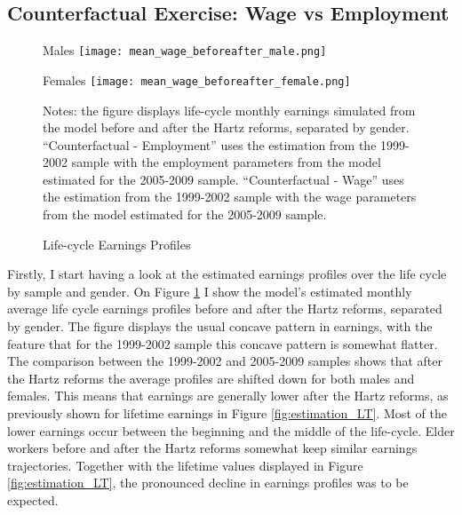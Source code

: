 \documentclass[12pt, a4paper]{article}
\let\Oldsubsection\subsection
\renewcommand{\subsection}{\FloatBarrier\Oldsubsection}
\begin{document}
\subsection{Counterfactual Exercise: Wage vs Employment}

\begin{figure}[!t]
	\centering
	\begin{minipage}[b]{0.48\textwidth}{Males}
		\centering
		\texttt{[image: mean\_wage\_beforeafter\_male.png]}
	\end{minipage}
	\begin{minipage}[b]{0.48\textwidth}{Females}
		\centering
		\texttt{[image: mean\_wage\_beforeafter\_female.png]}
	\end{minipage}
	\footnotesize{
		\justifying Notes: the figure displays life-cycle monthly earnings simulated from the model before and after the Hartz reforms, separated by gender. ``Counterfactual - Employment'' uses the estimation from the 1999-2002 sample with the employment parameters from the model estimated for the 2005-2009 sample. ``Counterfactual - Wage'' uses the estimation from the 1999-2002 sample with the wage parameters from the model estimated for the 2005-2009 sample.\par}
	\captionsetup{font=small,justification=raggedright}
	\caption{Life-cycle Earnings Profiles}\label{fig:earnings_profiles}
\end{figure}

Firstly, I start having a look at the estimated earnings profiles over the life cycle by sample and gender. On Figure \ref{fig:earnings_profiles} I show the model's estimated monthly average life cycle earnings profiles before and after the Hartz reforms, separated by gender. The figure displays the usual concave pattern in earnings, with the feature that for the 1999-2002 sample this concave pattern is somewhat flatter. The comparison between the 1999-2002 and 2005-2009 samples shows that after the Hartz reforms the average profiles are shifted down for both males and females. This means that earnings are generally lower after the Hartz reforms, as previously shown for lifetime earnings in Figure \ref{fig:estimation_LT}. Most of the lower earnings occur between the beginning and the middle of the life-cycle. Elder workers before and after the Hartz reforms somewhat keep similar earnings trajectories. Together with the lifetime values displayed in Figure \ref{fig:estimation_LT}, the pronounced decline in earnings profiles was to be expected. 
\end{document}
